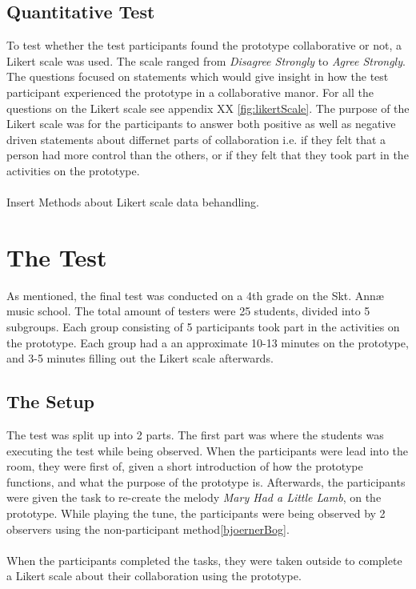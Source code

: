 \subsection{Quantitative Test}
To test whether the test participants found the prototype collaborative or not, a Likert scale was used. The scale ranged from \textit{Disagree Strongly} to \textit{Agree Strongly}. The questions focused on statements which would give insight in how the test participant experienced the prototype in a collaborative manor. For all the questions on the Likert scale see appendix XX \ref{fig:likertScale}. The purpose of the Likert scale was for the participants to answer both positive as well as negative driven statements about differnet parts of collaboration i.e. if they felt that a person had more control than the others, or if they felt that they took part in the activities on the prototype.\\\\
Insert Methods about Likert scale data behandling.

\section{The Test}
As mentioned, the final test was conducted on a 4th grade on the Skt. Annæ music school. The total amount of testers were 25 students,  divided into 5 subgroups. Each group consisting of 5 participants took part in the activities on the prototype. Each group had a an approximate 10-13 minutes on the prototype, and 3-5 minutes filling out the Likert scale afterwards.

\subsection{The Setup}
The test was split up into 2 parts. The first part was where the students was executing the test while being observed. When the participants were lead into the room, they were first of, given a short introduction of how the prototype functions, and what the purpose of the prototype is. Afterwards, the participants were given the task to re-create the melody \textit{Mary Had a Little Lamb}, on the prototype. While playing the tune, the participants were being observed by 2 observers using the non-participant method\ref{bjoernerBog}. \\\\
When the participants completed the tasks, they were taken outside to complete a Likert scale about their collaboration using the prototype. 

